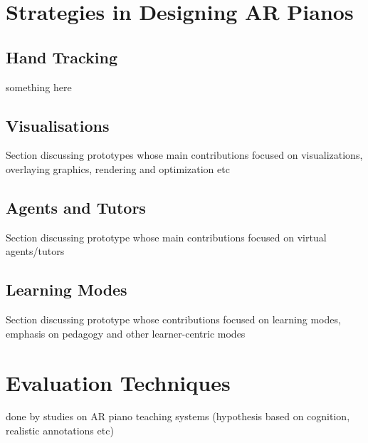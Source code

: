 \documentclass[manuscript,screen]{acmart}
\begin{document}
\section{Strategies in Designing AR Pianos}
\label{sec: strat}
\subsection{Hand Tracking}
something here 
\subsection{Visualisations}
Section discussing prototypes whose main contributions focused on visualizations, overlaying graphics, rendering and optimization etc
\subsection{Agents and Tutors}
Section discussing prototype whose main contributions focused on virtual agents/tutors 
\subsection{Learning Modes}
Section discussing prototype whose contributions focused on learning modes, emphasis on pedagogy and other learner-centric modes
\section{Evaluation Techniques}
done by studies on AR piano teaching systems (hypothesis based on cognition, realistic annotations etc)
\end{document}
